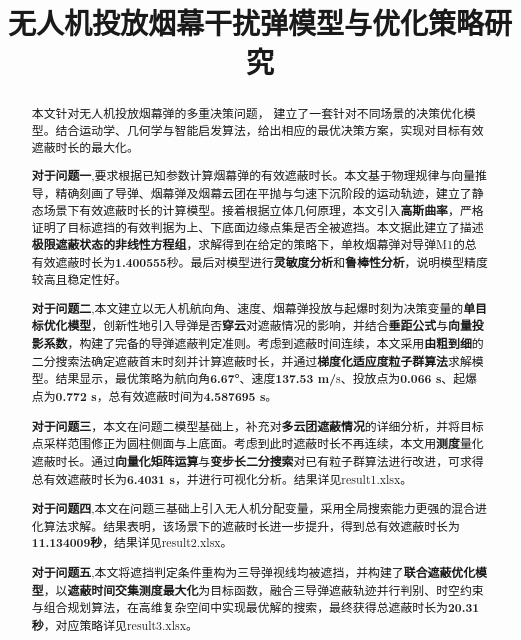 \documentclass[withoutpreface,bwprint]{cumcmthesis}
\title{无人机投放烟幕干扰弹模型与优化策略研究}  %
\numberwithin{equation}{section} %
\numberwithin{figure}{section} %
\numberwithin{table}{section}  %
\begin{document}
\maketitle
\begin{abstract}
 本文针对无人机投放烟幕弹的多重决策问题， 建立了一套针对不同场景的决策优化模型。结合运动学、几何学与智能启发算法，给出相应的最优决策方案，实现对目标有效遮蔽时长的最大化。

\textbf{对于问题一},要求根据已知参数计算烟幕弹的有效遮蔽时长。本文基于物理规律与向量推导，精确刻画了导弹、烟幕弹及烟幕云团在平抛与匀速下沉阶段的运动轨迹，建立了静态场景下有效遮蔽时长的计算模型。接着根据立体几何原理，本文引入\textbf{高斯曲率}，严格证明了目标遮挡的有效判据为上、下底面边缘点集是否全被遮挡。本文据此建立了描述\textbf{极限遮蔽状态的非线性方程组}，求解得到在给定的策略下，单枚烟幕弹对导弹M1的总有效遮蔽时长为\textbf{1.400555}秒。最后对模型进行\textbf{灵敏度分析}和\textbf{鲁棒性分析}，说明模型精度较高且稳定性好。

\textbf{对于问题二},本文建立以无人机航向角、速度、烟幕弹投放与起爆时刻为决策变量的\textbf{单目标优化模型}，创新性地引入导弹是否\textbf{穿云}对遮蔽情况的影响，并结合\textbf{垂距公式}与\textbf{向量投影系数}，构建了完备的导弹遮蔽判定准则。考虑到遮蔽时间连续，本文采用\textbf{由粗到细}的二分搜索法确定遮蔽首末时刻并计算遮蔽时长，并通过\textbf{梯度化适应度粒子群算法}求解模型。结果显示，最优策略为航向角\textbf{6.67°}、速度\textbf{137.53 m/}s、投放点为\textbf{0.066 s}、起爆点为\textbf{0.772 s}，总有效遮蔽时间为\textbf{4.587695 s}。

\textbf{对于问题三}，本文在问题二模型基础上，补充对\textbf{多云团遮蔽情况}的详细分析，并将目标点采样范围修正为圆柱侧面与上底面。考虑到此时遮蔽时长不再连续，本文用\textbf{测度}量化遮蔽时长。通过\textbf{向量化矩阵运算}与\textbf{变步长二分搜索}对已有粒子群算法进行改进，可求得总有效遮蔽时长为\textbf{6.4031 s}，并进行可视化分析。结果详见result1.xlsx。

\textbf{对于问题四},本文在问题三基础上引入无人机分配变量，采用全局搜索能力更强的混合进化算法求解。结果表明，该场景下的遮蔽时长进一步提升，得到总有效遮蔽时长为\textbf{11.134009秒}，结果详见result2.xlsx。

\textbf{对于问题五},本文将遮挡判定条件重构为三导弹视线均被遮挡，并构建了\textbf{联合遮蔽优化模型}，以\textbf{遮蔽时间交集测度最大化}为目标函数，融合三导弹遮蔽轨迹并行判别、时空约束与组合规划算法，在高维复杂空间中实现最优解的搜索，最终获得总遮蔽时长为\textbf{20.31秒}，对应策略详见result3.xlsx。


\textbf{}
\end{abstract}
\vspace{-0.5em}
\end{document}
